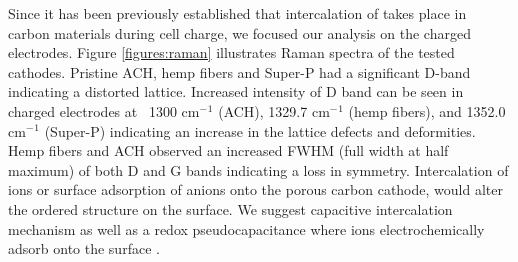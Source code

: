 Since it has been previously established that intercalation of  takes place in carbon materials during cell charge, we focused our analysis on the charged electrodes. Figure \ref{figures:raman} illustrates Raman spectra of the tested cathodes. Pristine ACH, hemp fibers and Super-P had a significant D-band indicating a distorted lattice. Increased intensity of D band can be seen in charged electrodes at ~1300 cm$^-{^1}$ (ACH), 1329.7 cm$^-{^1}$ (hemp fibers), and 1352.0 cm$^-{^1}$ (Super-P) indicating an increase in the lattice defects and deformities. Hemp fibers and ACH observed an increased FWHM (full width at half maximum) of both D and G bands indicating a loss in symmetry. Intercalation of ions or surface adsorption of anions onto the porous carbon cathode, would alter the ordered structure on the surface. We suggest capacitive intercalation mechanism as well as a redox pseudocapacitance where  ions electrochemically adsorb onto the surface \cite{brezesinski_ordered_2010}. 

